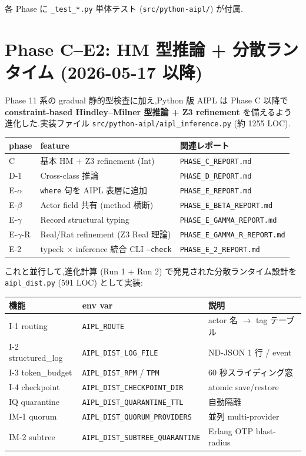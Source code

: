 \documentclass[11pt,a4paper]{article}
\begin{document}
各 Phase に \texttt{\_test\_*.py} 単体テスト (\texttt{src/python-aipl/}) が付属.

\section{Phase C--E2: HM 型推論 + 分散ランタイム (2026-05-17 以降)}

Phase 11 系の gradual 静的型検査に加え,Python 版 AIPL は Phase C 以降で
\textbf{constraint-based Hindley--Milner 型推論 + Z3 refinement} を備えるよう
進化した.実装ファイル \texttt{src/python-aipl/aipl\_inference.py} (約 1255 LOC).

\begin{center}
\begin{tabular}{lll}
\toprule
phase & feature & 関連レポート \\
\midrule
C & 基本 HM + Z3 refinement (Int) & \texttt{PHASE\_C\_REPORT.md} \\
D-1 & Cross-class 推論 & \texttt{PHASE\_D\_REPORT.md} \\
E-$\alpha$ & \texttt{where} 句を AIPL 表層に追加 & \texttt{PHASE\_E\_REPORT.md} \\
E-$\beta$ & Actor field 共有 (method 横断) & \texttt{PHASE\_E\_BETA\_REPORT.md} \\
E-$\gamma$ & Record structural typing & \texttt{PHASE\_E\_GAMMA\_REPORT.md} \\
E-$\gamma$-R & Real/Rat refinement (Z3 Real 理論) & \texttt{PHASE\_E\_GAMMA\_R\_REPORT.md} \\
E-2 & typeck $\times$ inference 統合 CLI \texttt{--check} & \texttt{PHASE\_E\_2\_REPORT.md} \\
\bottomrule
\end{tabular}
\end{center}

これと並行して,進化計算 (Run 1 + Run 2) で発見された分散ランタイム設計を
\texttt{aipl\_dist.py} (591 LOC) として実装:

\begin{center}
\begin{tabular}{p{2.6cm}p{5.5cm}p{6cm}}
\toprule
機能 & env var & 説明 \\
\midrule
I-1 routing & \texttt{AIPL\_ROUTE} & actor 名 $\to$ tag テーブル \\
I-2 structured\_log & \texttt{AIPL\_DIST\_LOG\_FILE} & ND-JSON 1 行 / event \\
I-3 token\_budget & \texttt{AIPL\_DIST\_RPM} / \texttt{TPM} & 60 秒スライディング窓 \\
I-4 checkpoint & \texttt{AIPL\_DIST\_CHECKPOINT\_DIR} & atomic save/restore \\
IQ quarantine & \texttt{AIPL\_DIST\_QUARANTINE\_TTL} & 自動隔離 \\
IM-1 quorum & \texttt{AIPL\_DIST\_QUORUM\_PROVIDERS} & 並列 multi-provider \\
IM-2 subtree & \texttt{AIPL\_DIST\_SUBTREE\_QUARANTINE} & Erlang OTP blast-radius \\
\bottomrule
\end{tabular}
\end{center}
\end{document}
